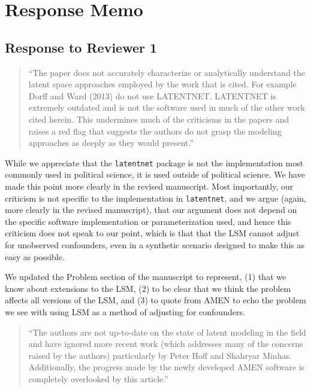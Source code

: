 \section{Response Memo}\label{response-memo}

\subsection{Response to Reviewer 1}\label{response-to-reviewer-1}

\begin{quote}
``The paper does not accurately characterize or analytically understand
the latent space approaches employed by the work that is cited. For
example Dorff and Ward (2013) do not use LATENTNET. LATENTNET is
extremely outdated and is not the software used in much of the other
work cited herein. This undermines much of the criticisms in the papers
and raises a red flag that suggests the authors do not grasp the
modeling approaches as deeply as they would present.''
\end{quote}

While we appreciate that the \texttt{latentnet} package is not the
implementation most commonly used in political science, it is used
outside of political science. We have made this point more clearly in
the revised manuscript. Most importantly, our criticism is not specific
to the implementation in \texttt{latentnet}, and we argue (again, more
clearly in the revised manuscript), that our argument does not depend on
the specific software implementation or parameterization used, and hence
this criticism does not speak to our point, which is that that the LSM
cannot adjust for unobserved confounders, even in a synthetic scenario
designed to make this as easy as possible.

We updated the Problem section of the manuscript to represent, (1) that we know about extensions to the LSM, (2) to be clear that we think the problem affects all versions of the LSM, and (3) to quote from AMEN to echo the problem we see with using LSM as a method of adjusting for confounders.

\begin{quote}
``The authors are not up-to-date on the state of latent modeling in the
field and have ignored more recent work (which addresses many of the
concerns raised by the authors) particularly by Peter Hoff and Shahryar
Minhas. Additionally, the progress made by the newly developed AMEN
software is completely overlooked by this article.''
\end{quote}

